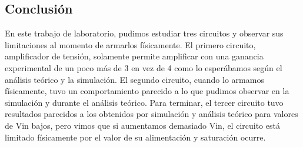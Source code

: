 \subsection{Conclusión}
En este trabajo de laboratorio, pudimos estudiar tres circuitos y observar sus limitaciones al momento de armarlos físicamente.
El primero circuito, amplificador de tensión, solamente permite amplificar con una ganancia experimental de un poco más de 3 en vez de 4 como lo esperábamos según el análisis teórico y la simulación.
El segundo circuito, cuando lo armamos físicamente, tuvo un comportamiento parecido a lo que pudimos observar en la simulación y durante el análisis teórico.
Para terminar, el tercer circuito tuvo resultados parecidos a los obtenidos por simulación y análisis teórico para valores de Vin bajos, pero vimos que si
aumentamos demasiado Vin, el circuito está limitado físicamente por el valor de su alimentación y saturación ocurre.